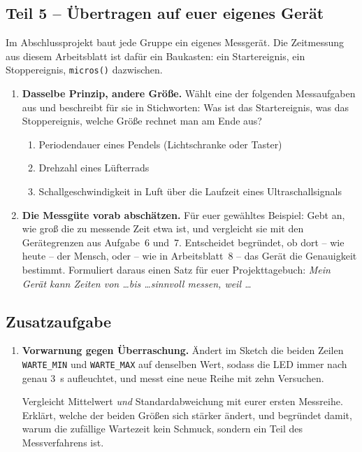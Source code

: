\documentclass[a4paper,12pt]{scrartcl}
\begin{document}
\subsection*{Teil 5 -- Übertragen auf euer eigenes Gerät}

\noindent Im Abschlussprojekt baut jede Gruppe ein eigenes Messgerät. Die Zeitmessung aus diesem
Arbeitsblatt ist dafür ein Baukasten: ein Startereignis, ein Stoppereignis, \texttt{micros()}
dazwischen.

\begin{enumerate}[leftmargin=2em, resume, itemsep=9pt, topsep=7pt]
\item \textbf{Dasselbe Prinzip, andere Größe.} Wählt eine der folgenden Messaufgaben aus und
beschreibt für sie in Stichworten: Was ist das Startereignis, was das Stoppereignis, welche
Größe rechnet man am Ende aus?
  \begin{enumerate}[label=(\alph*), leftmargin=2em, itemsep=6pt, topsep=5pt]
  \item Periodendauer eines Pendels (Lichtschranke oder Taster)
  \item Drehzahl eines Lüfterrads
  \item Schallgeschwindigkeit in Luft über die Laufzeit eines Ultraschallsignals
  \end{enumerate}

\item \textbf{Die Messgüte vorab abschätzen.} Für euer gewähltes Beispiel: Gebt an, wie groß die
zu messende Zeit etwa ist, und vergleicht sie mit den Gerätegrenzen aus Aufgabe~6
und~7. Entscheidet begründet, ob dort -- wie heute -- der Mensch, oder -- wie in Arbeitsblatt~8 --
das Gerät die Genauigkeit bestimmt. Formuliert daraus einen Satz für euer Projekttagebuch:
\emph{Mein Gerät kann Zeiten von \ldots bis \ldots sinnvoll messen, weil \ldots}
\end{enumerate}

\subsection*{Zusatzaufgabe}

\begin{enumerate}[leftmargin=2em, resume, itemsep=9pt, topsep=7pt]
\item \textbf{Vorwarnung gegen Überraschung.} Ändert im Sketch die beiden Zeilen
\texttt{WARTE\_MIN} und \texttt{WARTE\_MAX} auf denselben Wert, sodass die LED immer nach genau
\SI{3}{\second} aufleuchtet, und messt eine neue Reihe mit zehn Versuchen.

\smallskip
Vergleicht Mittelwert \emph{und} Standardabweichung mit eurer ersten Messreihe. Erklärt, welche
der beiden Größen sich stärker ändert, und begründet damit, warum die zufällige Wartezeit kein
Schmuck, sondern ein Teil des Messverfahrens ist.
\end{enumerate}
\end{document}
